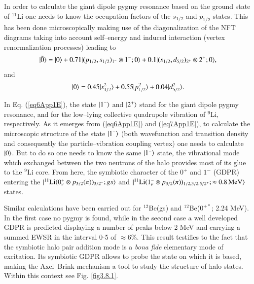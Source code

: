 \begin{subappendices}
In order to calculate the giant dipole pygmy resonance based on the ground state of $^{11}$Li one needs to know the occupation factors of the $s_{1/2}$ and $p_{1/2}$ states. This has been done microscopically making use of the diagonalization of the NFT diagrams taking into account self--energy and induced interaction (vertex renormalization processes) leading to
\begin{align}\label{eq6App1E}
|{\tilde 0} \rangle=|{0} \rangle+0.71|{(p_{1/2},s_{1/2})_{1^-}\otimes1^-;0} \rangle+0.1|{(s_{1/2},d_{5/2})_{2^+}\otimes2^+;0} \rangle,
\end{align}
and 
\begin{align}\label{eq7App1E}
|{0} \rangle=0.45|{s_{1/2}^2} \rangle+0.55|{p_{1/2}^2} \rangle+0.04|{d_{5/2}^2} \rangle.
\end{align}

In Eq. (\ref{eq6App1E}), the state $|{1^-} \rangle$ and $|{2^+} \rangle$ stand for the giant dipole pygmy resonance, and for the low--lying collective quadrupole vibration of $^9$Li, respectively. As it emerges from (\ref{eq6App1E}) and (\ref{eq7App1E}), to calculate the microscopic structure of the state $|{1^-} \rangle$ (both wavefunction and transition density and consequently the particle--vibration coupling vertex) one needs to calculate $|{0} \rangle$. But to do so one needs to know the same $|{1^-} \rangle$ state, the vibrational mode which exchanged between the two neutrons of the halo provides most of its glue to the $^9$Li core. From here, the symbiotic character of the $0^+$ and $1^-$ (GDPR) entering the $|{^{11}\text{Li}(0^+_\nu\otimes p_{3/2}(\pi))_{3/2^-};gs} \rangle$ and $|{^{11}\text{Li}(1^-_\nu\otimes p_{3/2}(\pi))_{1/2,3/2,5/2^+};\approx 0.8\, \text{MeV}} \rangle$ states.


 Similar calculations have been  carried out for $^{12}$Be(gs) and $^{12}$Be($0^{+*}$; 2.24 MeV). In the first case no pygmy is found, while in the second case a well developed GDPR is predicted displaying a number of peaks below 2 MeV and carrying a summed EWSR in the interval 0-5 of $\approx 6\%$. This result testifies to the fact that the symbiotic halo pair addition mode is a \textit{bona fide} elementary mode of excitation. Its symbiotic GDPR allows to probe the state on which it is based, making the Axel--Brink mechanism a tool to study the structure of halo states. Within this context see Fig. \ref{fig3.8.1}. 





















\end{subappendices}



\clearpage
\newpage
















 
%

% 
